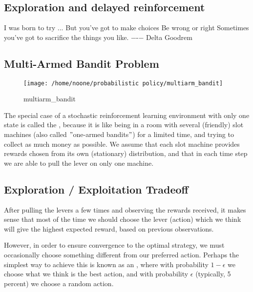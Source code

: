 \documentclass[11pt]{article}
\begin{document}
\subsection{Exploration and delayed reinforcement}\label{subsec:exploration-and-delayed-reinforcement}

    I was born to try ...
    But you've got to make choices
    Be wrong or right
    Sometimes you've got to sacrifice the things you like.
    −\qquad-− Delta Goodrem

\subsection{Multi-Armed Bandit Problem}\label{subsec:multi-armed-bandit-problem}

\begin{figure}[h]
    \centering
    \texttt{[image: /home/noone/probabilistic policy/multiarm\_bandit]}
    \caption[multiarm_bandit]{multiarm_bandit}
    \label{fig:multiarm_bandit}
\end{figure}

The special case of a stochastic reinforcement learning environment with only
one state is called the , because it is like being
in a room with several (friendly) slot machines (also called \("\)one-armed
bandits\("\)) for a limited time, and trying to collect as much money as
possible.
We assume that each slot machine provides rewards chosen from its own
(stationary) distribution, and that in each time step we are able to pull the
lever on only one machine.

\subsection{Exploration / Exploitation Tradeoff}\label{subsec:exploration-/-exploitation-tradeoff}
After pulling the levers a few times and observing the rewards received, it
makes sense that most of the time we should choose the lever (action) which we
think will give the highest expected reward, based on previous observations.

However, in order to ensure convergence to the optimal strategy, we must
occasionally choose something different from our preferred action.
Perhaps the simplest way to achieve this is known as an , where with probability $1 - \epsilon$ we choose what we think is the
best action, and with probability $\epsilon$ (typically, 5 percent) we choose
a random action.
\end{document}
